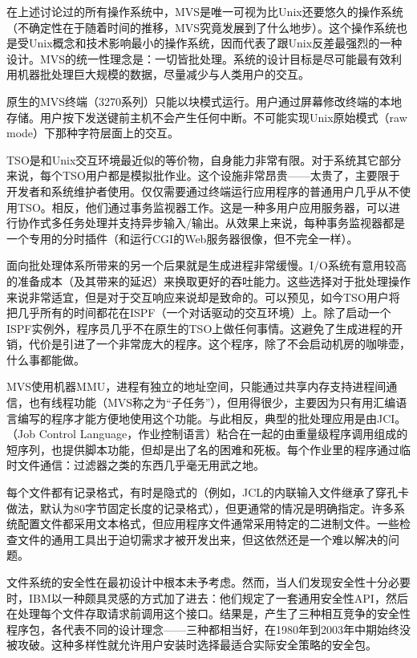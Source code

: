 \documentclass[12pt,oneside]{book}
\begin{document}
在上述讨论过的所有操作系统中，MVS是唯一可视为比Unix还要悠久的操作系统（不确定性在于随着时间的推移，MVS究竟发展到了什么地步）。这个操作系统也是受Unix概念和技术影响最小的操作系统，因而代表了跟Unix反差最强烈的一种设计。MVS的统一性理念是：一切皆批处理。系统的设计目标是尽可能最有效利用机器批处理巨大规模的数据，尽量减少与人类用户的交互。

原生的MVS终端（3270系列）只能以块模式运行。用户通过屏幕修改终端的本地存储。用户按下发送键前主机不会产生任何中断。不可能实现Unix原始模式（raw mode）下那种字符层面上的交互。

TSO是和Unix交互环境最近似的等价物，自身能力非常有限。对于系统其它部分来说，每个TSO用户都是模拟批作业。这个设施非常昂贵——太贵了，主要限于开发者和系统维护者使用。仅仅需要通过终端运行应用程序的普通用户几乎从不使用TSO。相反，他们通过事务监视器工作。这是一种多用户应用服务器，可以进行协作式多任务处理并支持异步输入/输出。从效果上来说，每种事务监视器都是一个专用的分时插件（和运行CGI的Web服务器很像，但不完全一样）。

面向批处理体系所带来的另一个后果就是生成进程非常缓慢。I/O系统有意用较高的准备成本（及其带来的延迟）来换取更好的吞吐能力。这些选择对于批处理操作来说非常适宜，但是对于交互响应来说却是致命的。可以预见，如今TSO用户将把几乎所有的时间都花在ISPF（一个对话驱动的交互环境）上。除了启动一个ISPF实例外，程序员几乎不在原生的TSO上做任何事情。这避免了生成进程的开销，代价是引进了一个非常庞大的程序。这个程序，除了不会启动机房的咖啡壶，什么事都能做。

MVS使用机器MMU，进程有独立的地址空间，只能通过共享内存支持进程间通信，也有线程功能（MVS称之为“子任务”），但用得很少，主要因为只有用汇编语言编写的程序才能方便地使用这个功能。与此相反，典型的批处理应用是由JCI。（Job Control Language，作业控制语言）粘合在一起的由重量级程序调用组成的短序列，也提供脚本功能，但却是出了名的困难和死板。每个作业里的程序通过临时文件通信：过滤器之类的东西几乎毫无用武之地。

每个文件都有记录格式，有时是隐式的（例如，JCL的内联输入文件继承了穿孔卡做法，默认为80字节固定长度的记录格式），但更通常的情况是明确指定。许多系统配置文件都采用文本格式，但应用程序文件通常采用特定的二进制文件。一些检查文件的通用工具出于迫切需求才被开发出来，但这依然还是一个难以解决的问题。

文件系统的安全性在最初设计中根本未予考虑。然而，当人们发现安全性十分必要时，IBM以一种颇具灵感的方式加了进去：他们规定了一套通用安全性API，然后在处理每个文件存取请求前调用这个接口。结果是，产生了三种相互竞争的安全性程序包，各代表不同的设计理念——三种都相当好，在1980年到2003年中期始终没被攻破。这种多样性就允许用户安装时选择最适合实际安全策略的安全包。
\end{document}
